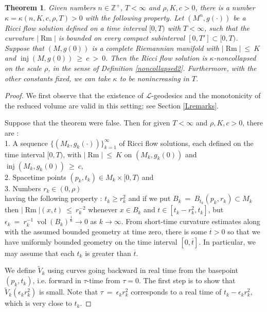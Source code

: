 \documentclass[12pt]{amsart}
\newcommand{\inj}{\operatorname{inj}}
\renewcommand{\L}{{\mathcal L}}
\newcommand{\Rm}{\operatorname{Rm}}
\newcommand{\vol}{\operatorname{vol}}
\newcommand{\Z}{{\mathbb Z}}
\numberwithin{equation}{section}
\theoremstyle{plain}
\newtheorem{theorem}[equation]{Theorem}
\theoremstyle{definition}
\theoremstyle{remark}
\begin{document}
\begin{theorem} \label{nolocalcollapse}
Given numbers $n \in \Z^+$,  $T < \infty$
and $\rho, K, c > 0$, there is a number $\kappa = \kappa(n,K,c,\rho, T)>0$
with the following property.
Let $(M^n, g(\cdot))$ be a Ricci flow solution 
defined on a
time interval $[0, T)$ with $T < \infty$, such that the curvature $|\Rm|$
is bounded on every compact subinterval $[0,T']\subset [0,T)$. 
Suppose that $(M, g(0))$ is a complete
Riemannian manifold with $|\Rm| \: \le \: K$ and
$\inj(M, g(0)) \: \ge \: c \: > \: 0$. Then
the Ricci flow solution is $\kappa$-noncollapsed on the scale $\rho$,
in the sense of Definition \ref{noncollapsed2}.
Furthermore, with the other constants fixed, we can take
$\kappa$ to be nonincreasing in $T$.
\end{theorem}
\begin{proof}
We first observe that the existence of $\L$-geodesics and the 
monotonicity of the reduced volume are valid in this setting; see Section \ref{Lremarks}. 

Suppose that the theorem were false.  Then for given $T < \infty$
and $\rho, K, c > 0$, there are : \\
1. A sequence
$\{(M_k, g_k(\cdot))\}_{k=1}^\infty$ of Ricci flow solutions,
each defined on the
time interval $[0, T)$, with $|\Rm| \: \le \: K$ on $(M_k, g_k(0))$ and
$\inj(M_k, g_k(0)) \: \ge \: c$, \\
2. Spacetime points
$(p_k, t_k) \in M_k \times [0, T)$ and \\
3. Numbers $r_k \in (0, \rho)$ \\
having the following property :
$t_k \ge r_k^2$ and
if we put $B_k \: = \: B_{t_k}(p_k, r_k) \subset M_k$ then
$|\Rm|(x, t) \: \le \: r_k^{-2}$ whenever $x \in B_k$ and
$t \in [t_k - r_k^2, t_k]$, but
$\epsilon_k \: = \: r_k^{-1} \: \vol(B_k)^{\frac1n} \rightarrow 0$
as $k \rightarrow \infty$.
From short-time curvature estimates along with the assumed bounded geometry
at time zero, there is some $\overline{t} > 0$ so that
we have uniformly bounded geometry on the time interval
$[0, \overline{t}]$. In particular, we may assume that each
$t_k$ is greater than $\overline{t}$.

We define $\tilde{V}_k$ using curves
going backward in real time from the
basepoint $(p_k, t_k)$, i.e. forward in $\tau$-time from
$\tau = 0$.
The first step is to show that
$\tilde{V}_k(\epsilon_k r_k^2)$ is small. Note that 
$\tau \:  = \: \epsilon_k r_k^2$ corresponds to a real time of
$t_k - \epsilon_k r_k^2$, which is very close to $t_k$.


\end{proof}
\end{document}
